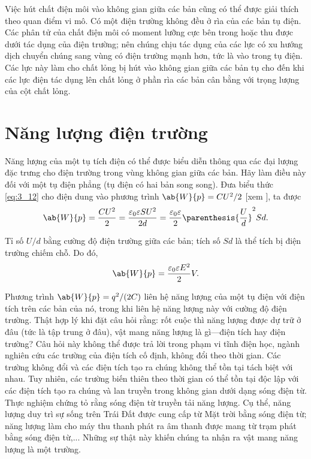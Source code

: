 Việc hút chất điện môi vào không gian giữa các bản cũng có thể được giải thích theo quan điểm vi mô. Có một điện trường không đều ở rìa của các bản tụ điện. Các phân tử của chất điện môi có moment lưỡng cực bên trong hoặc thu được dưới tác dụng của điện trường; nên chúng chịu tác dụng của các lực có xu hướng dịch chuyển chúng sang vùng có điện trường mạnh hơn, tức là vào trong tụ điện. Các lực này làm cho chất lỏng bị hút vào không gian giữa các bản tụ cho đến khi các lực điện tác dụng lên chất lỏng ở phần rìa các bản cân bằng với trọng lượng của cột chất lỏng. 

\section{Năng lượng điện trường}\label{sec:4_3}

Năng lượng của một tụ tích điện có thể được biểu diễn thông qua các đại lượng đặc trưng cho điện trường trong vùng không gian giữa các bản. Hãy làm điều này đối với một tụ điện phẳng (tụ điện có hai bản song song). Đưa biểu thức \eqref{eq:3_12} cho điện dung vào phương trình $\ab{W}{p}=CU^2/2$ [xem ], ta được
\begin{equation*}
	\ab{W}{p} = \frac{C U^2}{2} = \frac{\varepsilon_0 \varepsilon S U^2}{2 d} = \frac{\varepsilon_0 \varepsilon}{2} \parenthesis{\frac{U}{d}}^2 S d.
\end{equation*}

\noindent
Tỉ số $U/d$ bằng cường độ điện trường giữa các bản; tích số $Sd$ là thể tích bị điện trường chiếm chỗ. Do đó,
\begin{equation}\label{eq:4_9}
	\ab{W}{p} = \frac{\varepsilon_0 \varepsilon E^2}{2} V.
\end{equation}

Phương trình $\ab{W}{p}=q^2/(2C)$ liên hệ năng lượng của một tụ điện với điện tích trên các bản của nó, trong khi  liên hệ năng lượng này với cường độ điện trường. Thật hợp lý khi đặt câu hỏi rằng: rốt cuộc thì năng lượng được dự trữ ở đâu (tức là tập trung ở đâu), vật mang năng lượng là gì---điện tích hay điện trường? Câu hỏi này không thể được trả lời trong phạm vi tĩnh điện học, ngành nghiên cứu các trường của điện tích cố định, không đổi theo thời gian. Các trường không đổi và các điện tích tạo ra chúng không thể tồn tại tách biệt với nhau. Tuy nhiên, các trường biến thiên theo thời gian có thể tồn tại độc lập với các điện tích tạo ra chúng và lan truyền trong không gian dưới dạng sóng điện từ. Thực nghiệm chứng tỏ rằng sóng điện từ truyền tải năng lượng. Cụ thể, năng lượng duy trì sự sống trên Trái Đất được cung cấp từ Mặt trời bằng sóng điện từ; năng lượng làm cho máy thu thanh phát ra âm thanh được mang từ trạm phát bằng sóng điện từ,... Những sự thật này khiến chúng ta nhận ra vật mang năng lượng là một trường. 


